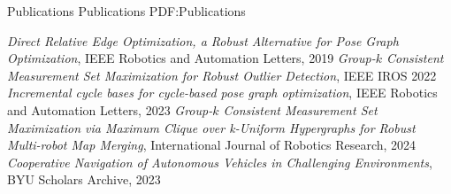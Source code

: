 \documentclass[letterpaper,MMMyyyy,nonstopmode]{simpleresumecv}
\begin{document}
\begin{Body}




\Section
{Publications}
{Publications}
{PDF:Publications}

\BulletItem
\textit{Direct Relative Edge Optimization, a Robust Alternative for Pose Graph Optimization}, IEEE Robotics and Automation Letters, 2019
\BulletItem \textit{Group-$k$ Consistent Measurement Set Maximization for Robust Outlier Detection}, IEEE IROS 2022
\BulletItem \textit{Incremental cycle bases for cycle-based pose graph optimization}, IEEE Robotics and Automation Letters, 2023
\BulletItem \textit{Group-$k$ Consistent Measurement Set Maximization via Maximum Clique over k-Uniform Hypergraphs for Robust Multi-robot Map Merging}, International Journal of Robotics Research, 2024
\BulletItem \textit{Cooperative Navigation of Autonomous Vehicles in Challenging Environments}, BYU Scholars Archive, 2023






\end{Body}

\thispagestyle{empty}
\end{document}
